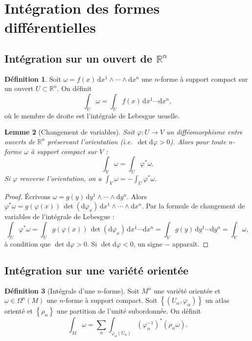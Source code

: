 \documentclass[12pt,a4paper,openany]{book}
\theoremstyle{definition}
\newtheorem{definition}{Définition}[chapter]
\theoremstyle{plain}
\newtheorem{lemme}[definition]{Lemme}
\theoremstyle{remark}
\newcommand{\R}{\mathbb{R}}
\newcommand{\dd}{\mathrm{d}}
\newcommand{\set}[1]{\left\{#1\right\}}
\begin{document}
\section{Intégration des formes différentielles}%
\label{sec:integration-formes}

\subsection{Intégration sur un ouvert de $\R^n$}%
\label{subsec:integration-Rn}

\begin{definition}\label{def:integration-Rn}%
\index{intégration!sur $\R^n$}
Soit $\omega = f(x)\, \dd x^1 \wedge \cdots \wedge \dd x^n$ une
$n$-forme à support compact sur un ouvert $U \subset \R^n$. On définit
\[
  \int_U \omega = \int_U f(x)\, \dd x^1 \cdots \dd x^n,
\]
où le membre de droite est l'intégrale de Lebesgue usuelle.
\end{definition}

\begin{lemme}[Changement de variables]\label{lem:changement-variables}%
Soit $\varphi \colon U \to V$ un difféomorphisme entre ouverts de $\R^n$
préservant l'orientation (i.e.\ $\det \dd\varphi > 0$). Alors pour toute
$n$-forme $\omega$ à support compact sur $V$ :
\[
  \int_V \omega = \int_U \varphi^*\omega.
\]
Si $\varphi$ renverse l'orientation, on a
$\int_V \omega = -\int_U \varphi^*\omega$.
\end{lemme}

\begin{proof}
Écrivons $\omega = g(y)\, \dd y^1 \wedge \cdots \wedge \dd y^n$.
Alors $\varphi^*\omega = g(\varphi(x))\, \det(\dd\varphi_x)\,
\dd x^1 \wedge \cdots \wedge \dd x^n$. Par la formule de changement de
variables de l'intégrale de Lebesgue :
\[
  \int_U \varphi^*\omega = \int_U g(\varphi(x))\, \det(\dd\varphi_x)\,
    \dd x^1 \cdots \dd x^n
    = \int_V g(y)\, \dd y^1 \cdots \dd y^n = \int_V \omega,
\]
à condition que $\det \dd\varphi > 0$. Si $\det \dd\varphi < 0$, un signe
$-$ apparaît.
\end{proof}

\subsection{Intégration sur une variété orientée}%
\label{subsec:integration-variete}

\begin{definition}[Intégrale d'une $n$-forme]\label{def:integrale-variete}%
Soit $M^n$ une variété orientée et $\omega \in \Omega^n(M)$ une
$n$-forme à support compact. Soit $\set{(U_\alpha, \varphi_\alpha)}$
un atlas orienté et $\set{\rho_\alpha}$ une partition de l'unité
subordonnée. On définit
\[
  \int_M \omega = \sum_\alpha \int_{\varphi_\alpha(U_\alpha)}
    (\varphi_\alpha^{-1})^*(\rho_\alpha \omega).
\]
\end{definition}
\end{document}
